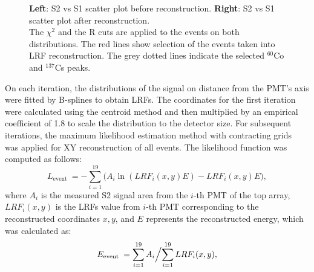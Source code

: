 \documentclass[a4paper,11pt]{article}
\begin{document}
%
\begin{figure}[htbp]
	\caption{\textbf{Left}: S2 vs S1 scatter plot before reconstruction.
 \textbf{Right}: S2 vs S1 scatter plot after reconstruction. \\The $\chi^2$ and the R cuts are applied to the events on both distributions. The red lines show selection of the events taken into LRF reconstruction. The grey dotted lines indicate the selected $^{60}$Co and $^{137}$Cs peaks.}
  \label{img:2dspectra}  
\end{figure}
%
On each iteration, the distributions of the signal on distance from the PMT's axis were fitted by B-splines to obtain LRFs. 
The coordinates for the first iteration were calculated using the centroid method and then multiplied by an empirical coefficient of 1.8 to scale the distribution to the detector size. 
For subsequent iterations, the maximum likelihood estimation method with contracting grids~\cite{grids} was applied for XY reconstruction of all events. The likelihood function was computed as follows:
%
\begin{equation}
L_{\text {event }}=-\sum\limits_{i=1}^{19} \Big( A_i \ln(LRF_i(x,y) E) - LRF_i(x,y) E \Big),
\end{equation}
where $A_i$ is the measured S2 signal area from the $i$-th PMT of the top array, $LRF_i(x,y)$ is the LRFs value from $i$-th PMT corresponding to the reconstructed coordinates $x,y$, and $E$ represents the reconstructed energy, which was calculated as:
\begin{equation}
\label{Energy_formula}
E_{\text {event }}={\sum\limits_{i=1}^{19} A_i}\Big{/}{\sum\limits_{i=1}^{19} LRF_i(x,y)},
\end{equation}
  
\end{document}
